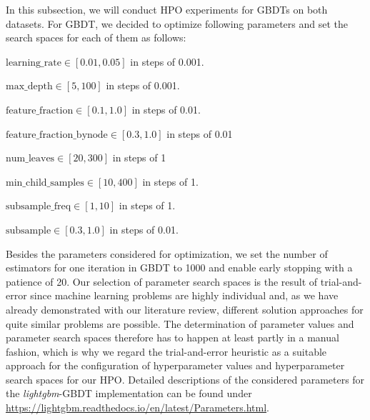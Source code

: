 In this subsection, we will conduct HPO experiments for GBDTs on both datasets. 
For GBDT, we decided to optimize following parameters and set the search spaces for each of them as follows:
\begin{description}[font=$\bullet$\scshape\bfseries]
	\item $ \text{learning\_rate} \in [0.01, 0.05] $  in steps of 0.001.
	\item $ \text{max\_depth} \in [5, 100] $ in steps of 0.001.
	\item $ \text{feature\_fraction} \in [0.1, 1.0] $ in steps of 0.01.
	\item $ \text{feature\_fraction\_bynode} \in [0.3, 1.0] $ in steps of 0.01
	\item $ \text{num\_leaves} \in [20, 300] $ in steps of 1
	\item $ \text{min\_child\_samples} \in [10, 400] $ in steps of 1.
	\item $ \text{subsample\_freq} \in [1, 10] $ in steps of 1.
	\item $ \text{subsample} \in [0.3, 1.0] $ in steps of 0.01.
\end{description}
Besides the parameters considered for optimization, we set the number of estimators for one iteration in GBDT to 1000 and enable early stopping with a patience of 20. Our selection of parameter search spaces is the result of trial-and-error since machine learning problems are highly individual and, as we have already demonstrated with our literature review, different solution approaches for quite similar problems are possible. The determination of parameter values and parameter search spaces therefore has to happen at least partly in a manual fashion, which is why we regard the trial-and-error heuristic as a suitable approach for the configuration of hyperparameter values and hyperparameter search spaces for our HPO. Detailed descriptions of the considered parameters for the \textit{lightgbm}-GBDT implementation can be found under \url{https://lightgbm.readthedocs.io/en/latest/Parameters.html}.

